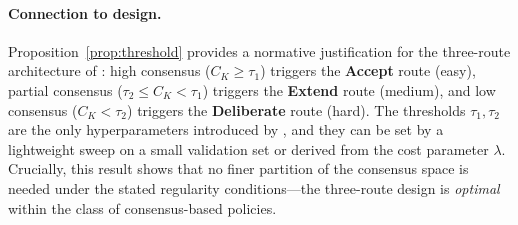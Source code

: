 \paragraph{Connection to \method{} design.}
Proposition~\ref{prop:threshold} provides a normative justification for
the three-route architecture of \method{}:
high consensus ($C_K \ge \tau_1$) triggers the \textbf{Accept} route
(easy),
partial consensus ($\tau_2 \le C_K < \tau_1$) triggers the \textbf{Extend}
route (medium),
and low consensus ($C_K < \tau_2$) triggers the \textbf{Deliberate} route
(hard).
The thresholds $\tau_1, \tau_2$ are the only hyperparameters introduced by
\method{}, and they can be set by a lightweight sweep on a small
validation set or derived from the cost parameter $\lambda$.
Crucially, this result shows that no finer partition of the consensus
space is needed under the stated regularity conditions---the three-route
design is \emph{optimal} within the class of consensus-based policies.
